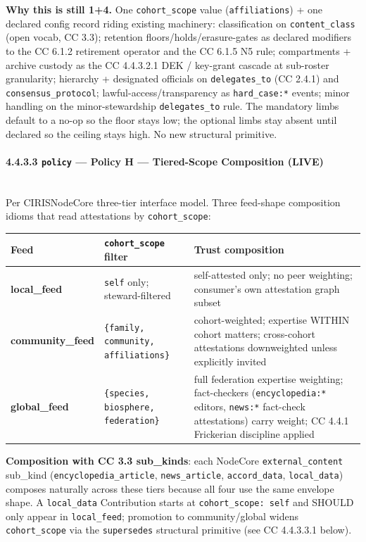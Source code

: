 \documentclass[11pt]{article}
\begin{document}
\textbf{Why this is still 1+4.} One \texttt{cohort\_scope} value (\texttt{affiliations}) + one declared config record riding existing machinery: classification on \texttt{content\_class} (open vocab, CC 3.3); retention floors/holds/erasure-gates as declared modifiers to the CC 6.1.2 retirement operator and the CC 6.1.5 N5 rule; compartments + archive custody as the CC 4.4.3.2.1 DEK / key-grant cascade at sub-roster granularity; hierarchy + designated officials on \texttt{delegates\_to} (CC 2.4.1) and \texttt{consensus\_protocol}; lawful-access/transparency as \texttt{hard\_case:*} events; minor handling on the minor-stewardship \texttt{delegates\_to} rule. The mandatory limbs default to a no-op so the floor stays low; the optional limbs stay absent until declared so the ceiling stays high. No new structural primitive.


\paragraph{4.4.3.3 \texttt{policy} — Policy H — Tiered-Scope Composition (LIVE)}\mbox{}\\


Per CIRISNodeCore three-tier interface model. Three feed-shape composition idioms that read attestations by \texttt{cohort\_scope}:


{\footnotesize
\begin{longtable}{|p{5.33cm}|p{5.33cm}|p{5.33cm}|}\hline
\textbf{Feed} & \textbf{\texttt{cohort\_scope} filter} & \textbf{Trust composition} \\ \hline\endhead
\textbf{local\_feed} & \texttt{self} only; steward-filtered & self-attested only; no peer weighting; consumer's own attestation graph subset \\ \hline
\textbf{community\_feed} & \texttt{\{family, community, affiliations\}} & cohort-weighted; expertise WITHIN cohort matters; cross-cohort attestations downweighted unless explicitly invited \\ \hline
\textbf{global\_feed} & \texttt{\{species, biosphere, federation\}} & full federation expertise weighting; fact-checkers (\texttt{encyclopedia:*} editors, \texttt{news:*} fact-check attestations) carry weight; CC 4.4.1 Frickerian discipline applied \\ \hline
\end{longtable}}


\textbf{Composition with CC 3.3 sub\_kinds}: each NodeCore \texttt{external\_content} sub\_kind (\texttt{encyclopedia\_article}, \texttt{news\_article}, \texttt{accord\_data}, \texttt{local\_data}) composes naturally across these tiers because all four use the same envelope shape. A \texttt{local\_data} Contribution starts at \texttt{cohort\_scope: self} and SHOULD only appear in \texttt{local\_feed}; promotion to community/global widens \texttt{cohort\_scope} via the \texttt{supersedes} structural primitive (see CC 4.4.3.3.1 below).
\end{document}
